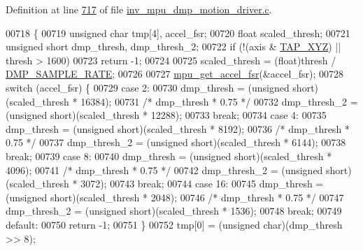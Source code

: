 Definition at line \hyperlink{inv__mpu__dmp__motion__driver_8c_source_l00717}{717} of file \hyperlink{inv__mpu__dmp__motion__driver_8c_source}{inv\+\_\+mpu\+\_\+dmp\+\_\+motion\+\_\+driver.\+c}.


\begin{DoxyCode}
00718 \{
00719     \textcolor{keywordtype}{unsigned} \textcolor{keywordtype}{char} tmp[4], accel\_fsr;
00720     \textcolor{keywordtype}{float} scaled\_thresh;
00721     \textcolor{keywordtype}{unsigned} \textcolor{keywordtype}{short} dmp\_thresh, dmp\_thresh\_2;
00722     \textcolor{keywordflow}{if} (!(axis & \hyperlink{group___d_r_i_v_e_r_s_gaa2b8e1661eb53aeac3ff4877ff2b79d9}{TAP\_XYZ}) || thresh > 1600)
00723         \textcolor{keywordflow}{return} -1;
00724 
00725     scaled\_thresh = (float)thresh / \hyperlink{group___d_r_i_v_e_r_s_ga9d0f0425cbcb58186500cb8686e41e67}{DMP\_SAMPLE\_RATE};
00726 
00727     \hyperlink{group___d_r_i_v_e_r_s_gab6087a15ee23db23b6aec41590329a60}{mpu\_get\_accel\_fsr}(&accel\_fsr);
00728     \textcolor{keywordflow}{switch} (accel\_fsr) \{
00729     \textcolor{keywordflow}{case} 2:
00730         dmp\_thresh = (\textcolor{keywordtype}{unsigned} short)(scaled\_thresh * 16384);
00731         \textcolor{comment}{/* dmp\_thresh * 0.75 */}
00732         dmp\_thresh\_2 = (\textcolor{keywordtype}{unsigned} short)(scaled\_thresh * 12288);
00733         \textcolor{keywordflow}{break};
00734     \textcolor{keywordflow}{case} 4:
00735         dmp\_thresh = (\textcolor{keywordtype}{unsigned} short)(scaled\_thresh * 8192);
00736         \textcolor{comment}{/* dmp\_thresh * 0.75 */}
00737         dmp\_thresh\_2 = (\textcolor{keywordtype}{unsigned} short)(scaled\_thresh * 6144);
00738         \textcolor{keywordflow}{break};
00739     \textcolor{keywordflow}{case} 8:
00740         dmp\_thresh = (\textcolor{keywordtype}{unsigned} short)(scaled\_thresh * 4096);
00741         \textcolor{comment}{/* dmp\_thresh * 0.75 */}
00742         dmp\_thresh\_2 = (\textcolor{keywordtype}{unsigned} short)(scaled\_thresh * 3072);
00743         \textcolor{keywordflow}{break};
00744     \textcolor{keywordflow}{case} 16:
00745         dmp\_thresh = (\textcolor{keywordtype}{unsigned} short)(scaled\_thresh * 2048);
00746         \textcolor{comment}{/* dmp\_thresh * 0.75 */}
00747         dmp\_thresh\_2 = (\textcolor{keywordtype}{unsigned} short)(scaled\_thresh * 1536);
00748         \textcolor{keywordflow}{break};
00749     \textcolor{keywordflow}{default}:
00750         \textcolor{keywordflow}{return} -1;
00751     \}
00752     tmp[0] = (\textcolor{keywordtype}{unsigned} char)(dmp\_thresh >> 8);

\end{DoxyCode}
